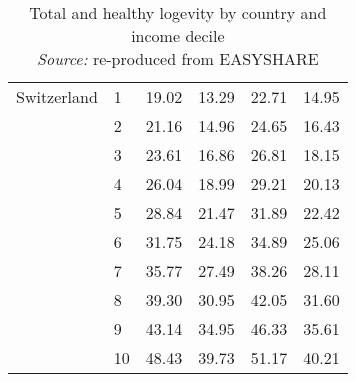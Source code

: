 \begin{table}
\begin{tabular}{llrrrr}
Switzerland & 1  &   19.02 &  13.29 &  22.71 &  14.95 \\
            & 2  &   21.16 &  14.96 &  24.65 &  16.43 \\
            & 3  &   23.61 &  16.86 &  26.81 &  18.15 \\
            & 4  &   26.04 &  18.99 &  29.21 &  20.13 \\
            & 5  &   28.84 &  21.47 &  31.89 &  22.42 \\
            & 6  &   31.75 &  24.18 &  34.89 &  25.06 \\
            & 7  &   35.77 &  27.49 &  38.26 &  28.11 \\
            & 8  &   39.30 &  30.95 &  42.05 &  31.60 \\
            & 9  &   43.14 &  34.95 &  46.33 &  35.61 \\
            & 10 &   48.43 &  39.73 &  51.17 &  40.21 \\
\bottomrule
\end{tabular}
\captionsetup{justification=centering}
\caption{Total and healthy logevity by country and income decile \\ 
\textit{Source:} re-produced from EASYSHARE }
\end{table}














